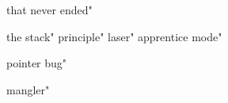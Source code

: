 
 that never ended"


 the stack"
 principle"
 laser"
 apprentice mode"


 pointer bug"




 mangler"

